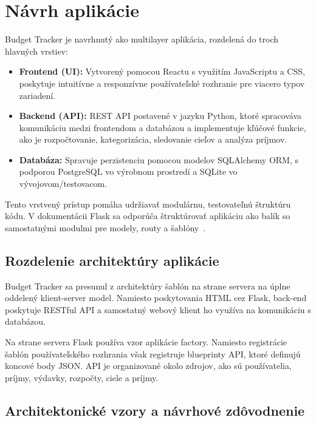 
\section{Návrh aplikácie}

Budget Tracker je navrhnutý ako multilayer aplikácia, rozdelená do troch hlavných vrstiev:

\begin{itemize}
    \item \textbf{Frontend (UI):} Vytvorený pomocou Reactu s využitím JavaScriptu a CSS, poskytuje intuitívne a responzívne používateľské rozhranie pre viacero typov zariadení.
    \item \textbf{Backend (API):} REST API postavené v jazyku Python, ktoré spracováva komunikáciu medzi frontendom a databázou a implementuje kľúčové funkcie, ako je rozpočtovanie, kategorizácia, sledovanie cieľov a analýza príjmov.
    \item \textbf{Databáza:} Spravuje perzistenciu pomocou modelov SQLAlchemy ORM, s podporou PostgreSQL vo výrobnom prostredí a SQLite vo vývojovom/testovacom.
\end{itemize}

Tento vrstvený prístup pomáha udržiavať modulárnu, testovateľnú štruktúru kódu. V dokumentácii Flask sa odporúča štruktúrovať aplikáciu ako balík so samostatnými modulmi pre modely, routy a šablóny~\cite{flask-sqlalchemy-pattern}.

\subsection{Rozdelenie architektúry aplikácie}

Budget Tracker sa presunul z architektúry šablón na strane servera na úplne oddelený klient-server model. Namiesto poskytovania HTML cez Flask, back-end poskytuje RESTful API a samostatný webový klient ho využíva na komunikáciu s databázou.

Na strane servera Flask používa vzor aplikácie factory. Namiesto registrácie šablón používateľského rozhrania však registruje blueprinty API, ktoré definujú koncové body JSON. API je organizované okolo zdrojov, ako sú používatelia, príjmy, výdavky, rozpočty, ciele a príjmy.


\subsection{Architektonické vzory a návrhové zdôvodnenie}

